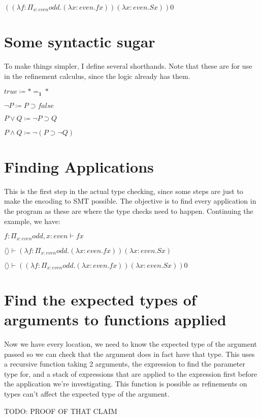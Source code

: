 \documentclass[12pt,a4paper,titlepage]{article}
\begin{document}
    $((\lambda f: \Pi_{x: even} odd . (\lambda x: even . f x)) (\lambda x: even . S x)) 0$

    \section{Some syntactic sugar}
    To make things simpler, I define several shorthands. Note that these are for use in the refinement calculus, since the logic already has them.

    $true \coloneqq \ast =_\textbf{1} \ast$

    $\neg P \coloneqq P \supset false$

    $P \lor Q \coloneqq \neg P \supset Q$

    $P \land Q \coloneqq \neg (P \supset \neg Q)$

    \section{Finding Applications}

    This is the first step in the actual type checking, since some steps are just to make the encoding to SMT
    possible.
    The objective is to find every application in the program as these are where the type checks need to happen.
    Continuing the example, we have:

    $f: \Pi_{x: even} odd, x: even \vdash f x$

    $\langle \rangle \vdash (\lambda f: \Pi_{x: even} odd . (\lambda x: even . f x)) (\lambda x: even . S x)$

    $\langle \rangle \vdash ((\lambda f: \Pi_{x: even} odd . (\lambda x: even . f x)) (\lambda x: even . S x)) 0$

    \section{Find the expected types of arguments to functions applied}

    Now we have every location, we need to know the expected type of the argument passed so we can check that
    the argument does in fact have that type.
    This uses a recursive function taking 2 arguments, the expression to find the parameter type for,
    and a stack of expressions that are applied to the expression first before the application we're investigating.
    This function is possible as refinements on types can't affect the expected type of the argument.

    TODO: PROOF OF THAT CLAIM
\end{document}
